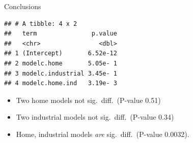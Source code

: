 \documentclass[ignorenonframetext,]{beamer}
\newenvironment{Shaded}{\begin{snugshade}}{\end{snugshade}}
\newcommand{\FloatTok}[1]{\textcolor[rgb]{0.00,0.00,0.81}{#1}}
\newcommand{\KeywordTok}[1]{\textcolor[rgb]{0.13,0.29,0.53}{\textbf{#1}}}
\newcommand{\NormalTok}[1]{#1}
\newcommand{\OperatorTok}[1]{\textcolor[rgb]{0.81,0.36,0.00}{\textbf{#1}}}
\newcommand{\StringTok}[1]{\textcolor[rgb]{0.31,0.60,0.02}{#1}}
\begin{document}
\begin{frame}[fragile]{Conclusions}
\protect\hypertarget{conclusions-2}{}

\begin{Shaded}
\end{Shaded}

\begin{verbatim}
## # A tibble: 4 x 2
##   term               p.value
##   <chr>                <dbl>
## 1 (Intercept)       6.52e-12
## 2 modelc.home       5.05e- 1
## 3 modelc.industrial 3.45e- 1
## 4 modelc.home.ind   3.19e- 3
\end{verbatim}

\begin{itemize}
\item
  Two home models not sig.~diff.~(P-value 0.51)
\item
  Two industrial models not sig.~diff.~(P-value 0.34)
\item
  Home, industrial models \emph{are} sig.~diff.~(P-value 0.0032).
\end{itemize}

\end{frame}
\end{document}
